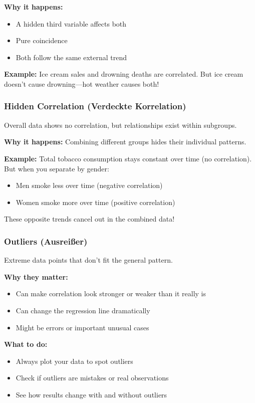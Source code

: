 \documentclass{article}
\begin{document}
\textbf{Why it happens:}
\begin{itemize}
    \item A hidden third variable affects both
    \item Pure coincidence
    \item Both follow the same external trend
\end{itemize}

\textbf{Example:} Ice cream sales and drowning deaths are correlated. But ice cream doesn't cause drowning—hot weather causes both!

\subsubsection{Hidden Correlation (Verdeckte Korrelation)}

Overall data shows no correlation, but relationships exist within subgroups.

\textbf{Why it happens:} Combining different groups hides their individual patterns.

\textbf{Example:} Total tobacco consumption stays constant over time (no correlation). But when you separate by gender:
\begin{itemize}
    \item Men smoke less over time (negative correlation)
    \item Women smoke more over time (positive correlation)
\end{itemize}
These opposite trends cancel out in the combined data!

\subsubsection{Outliers (Ausreißer)}

Extreme data points that don't fit the general pattern.

\textbf{Why they matter:}
\begin{itemize}
    \item Can make correlation look stronger or weaker than it really is
    \item Can change the regression line dramatically
    \item Might be errors or important unusual cases
\end{itemize}

\textbf{What to do:}
\begin{itemize}
    \item Always plot your data to spot outliers
    \item Check if outliers are mistakes or real observations
    \item See how results change with and without outliers
\end{itemize}
\end{document}
